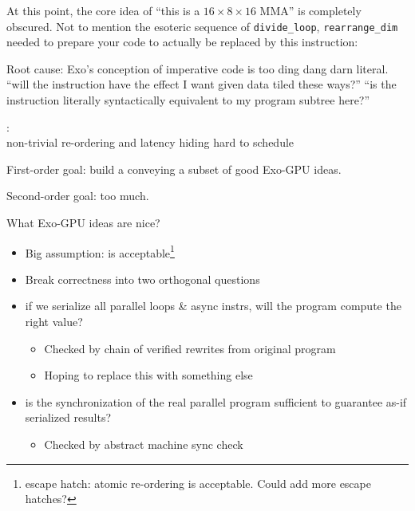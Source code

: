 \newpage
{}

{\LARGE

At this point, the core idea of ``this is a $16 \times 8 \times 16$ MMA'' is completely obscured.
Not to mention the esoteric sequence of \texttt{divide\_loop}, \texttt{rearrange\_dim} needed to prepare your code to actually be replaced by this instruction:

}

{\large

}

{\LARGE

Root cause: Exo's conception of imperative code is too ding dang darn literal.
 ``will the instruction have the effect I want given data tiled these ways?''
 ``is the instruction literally syntactically equivalent to my program subtree here?''

}

\newpage
{}

{\LARGE
{}:\\
non-trivial re-ordering and latency hiding hard to schedule
}

{

}

\newpage
{}

{\LARGE
First-order goal: build a  conveying a subset of good Exo-GPU ideas.

Second-order goal:  too much.

}

\newpage
{}

{\LARGE
What Exo-GPU ideas are nice?

\begin{itemize}
  \item Big assumption:  is acceptable\footnote{escape hatch: atomic re-ordering is acceptable. Could add more escape hatches?}
  \item Break correctness into two orthogonal questions
  \item {} if we serialize all parallel loops \& async instrs, will the program compute the right value?
  \begin{itemize}
    \item Checked by chain of verified rewrites from original program
    \item Hoping to replace this with something else
  \end{itemize}
  \item {} is the synchronization of the real parallel program sufficient to guarantee as-if serialized results?
  \begin{itemize}
    \item Checked by abstract machine sync check
  \end{itemize}
\end{itemize}

}

